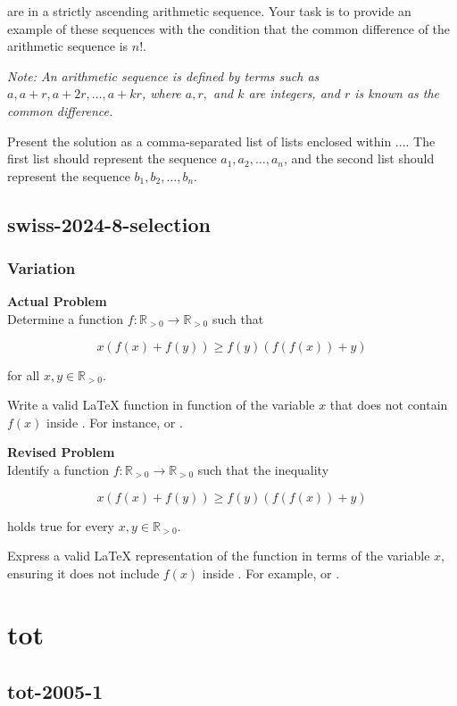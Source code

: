 are in a strictly ascending arithmetic sequence. Your task is to provide an example of these sequences with the condition that the common difference of the arithmetic sequence is \( n! \).

\textit{Note: An arithmetic sequence is defined by terms such as \( a, a + r, a + 2r, \ldots, a + kr \), where \( a, r, \) and \( k \) are integers, and \( r \) is known as the common difference.}

Present the solution as a comma-separated list of lists enclosed within \(\boxed{...}\). The first list should represent the sequence \( a_1, a_2, \ldots, a_n \), and the second list should represent the sequence \( b_1, b_2, \ldots, b_n \).

\subsection{swiss-2024-8-selection}
\subsubsection{Variation}
\textbf{Actual Problem}\\
Determine a function $f: \mathbb{R}_{> 0} \rightarrow \mathbb{R}_{> 0}$ such that 

$$x(f(x) + f(y)) \geq f(y)(f(f(x)) + y)$$

for all $x,y \in \mathbb{R}_{> 0}$.

Write a valid LaTeX function in function of the variable $x$ that does not contain $f(x)$ inside \boxed. For instance,  or .

\textbf{Revised Problem}\\
Identify a function $f: \mathbb{R}_{> 0} \rightarrow \mathbb{R}_{> 0}$ such that the inequality 

$$x(f(x) + f(y)) \geq f(y)(f(f(x)) + y)$$

holds true for every $x, y \in \mathbb{R}_{> 0}$.

Express a valid LaTeX representation of the function in terms of the variable $x$, ensuring it does not include $f(x)$ inside \boxed. For example,  or .

\section{tot}
\subsection{tot-2005-1}

